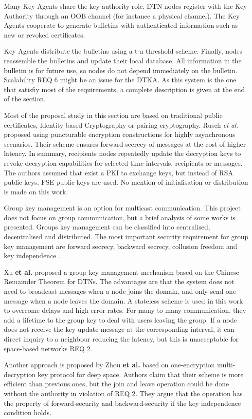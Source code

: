 Many Key Agents share the key authority role. DTN nodes register with the Key Authority through an OOB channel (for instance a physical channel). The Key Agents cooperate to generate bulletins with authenticated information such as new or revoked certificates. 

Key Agents distribute the bulletins using a t-n threshold scheme. Finally, nodes reassemble the bulletins and update their local database. All information in the bulletin is for future use, so nodes do not depend immediately on the bulletin. Scalability REQ 6 might be an issue for the DTKA. As this system is the one that satisfiy most of the requirements, a complete description is given at the end of the section.


Most of the proposal study in this section are based on traditional public certificates, Identity-based Cryptography or pairing cryptography. Rusch \textit{et al.}  \cite{rusch2017forward} proposed using puncturable encryption constructions for highly asynchronous scenarios. Their scheme ensures forward secrecy of messages at the cost of higher latency. In summary, recipients nodes repeatedly update the decryption keys to revoke decryption capabilities for selected time intervals, recipients or messages. The authors assumed that exist a PKI to exchange keys, but instead of RSA public keys, FSE public keys are used. No mention of initialisation or distribution is made on this work.


Group key management is an option for multicast communication. This project does not focus on group communication, but a brief analysis of some works is presented. Groups key management can be classified into centralised, decentralised and distributed. The most important security requirement for group key management are forward secrecy, backward secrecy, collusion freedom and key independence \cite{camtepe2005key}. 


Xu \textbf{et al.} \cite{xu2012chinese} proposed a group key management mechanism based on the Chinese Remainder Theorem for DTNs. The advantages are that the system does not need to broadcast messages when a node joins the domain, and only send one message when a node leaves the domain. A stateless scheme is used in this work to overcome delays and high error rates. For many to many communication, they add a lifetime to the group key to deal with users leaving the group. If a node does not receive the key update message at the corresponding interval, it can direct inquiry to a neighbour reducing the latency, but this is unacceptable for space-based networks REQ 2.

Another approach is proposed by Zhou \textbf{et al.} \cite{zhou2014autonomic} based on one-encryption multi-decryption key protocol for deep space. Authors claim that their scheme is more efficient than previous ones, but the join and leave operation could be done without the authority in violation of REQ 2. They argue that the operation has the property of forward-security and backward-security if the key independence condition holds.
 

